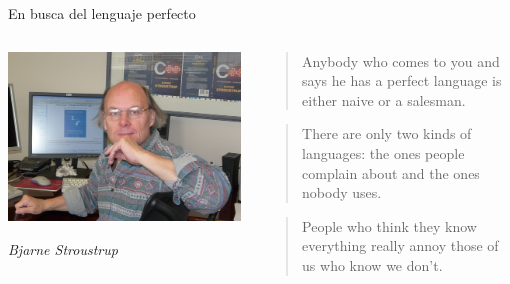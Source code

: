 \begin{frame}[t]{En busca del lenguaje perfecto}
  \begin{columns}
    \begin{column}{0.3\textwidth}
      \includegraphics[width=\textwidth]{images/stroustrup.jpg}

      \emph{Bjarne Stroustrup}
    \end{column}
    \begin{column}{0.7\textwidth}
      \begin{quote}
        Anybody who comes to you and says he has a perfect language is either naive or a salesman.
      \end{quote}
      \pause
      \begin{quote}
        There are only two kinds of languages: the ones people complain about and the ones nobody uses.
      \end{quote}
      \pause
      \begin{quote}
        People who think they know everything really annoy those of us who know we don't.
      \end{quote}
    \end{column}
  \end{columns}
\end{frame}

